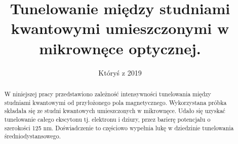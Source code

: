 \documentclass[licencjacka]{pracamgr}
\title{Tunelowanie między studniami kwantowymi umieszczonymi w mikrownęce optycznej.}
\date{Któryś z 2019}
\begin{document}
\maketitle

\begin{abstract}
  W niniejszej pracy przedstawiono zależność intensywności tunelowania między studniami kwantowymi od przyłożonego pola magnetycznego. Wykorzystana próbka składała się ze studni kwantowych umieszczonych w mikrownęce. Udało się uzyskać tunelowanie całego ekscytonu tj. elektronu i dziury, przez barierę potencjału o szerokości 125 nm. Doświadczenie to częściowo wypełnia lukę w dziedzinie tunelowania średniodystansowego.
\end{abstract}

\tableofcontents
\end{document}
